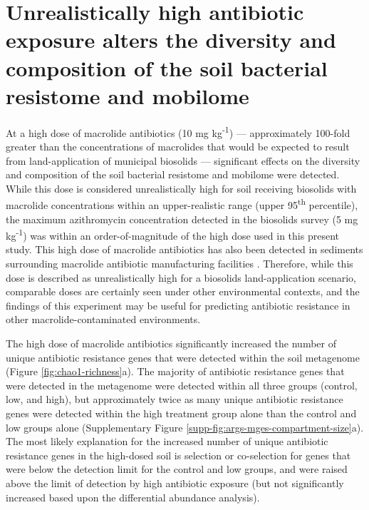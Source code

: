 \section{Unrealistically high antibiotic exposure alters the diversity and composition of the soil bacterial resistome and mobilome}

At a high dose of macrolide antibiotics (10 mg kg\textsuperscript{-1}) --- approximately 100-fold greater than the concentrations of macrolides that would be expected to result from land-application of municipal biosolids --- significant effects on the diversity and composition of the soil bacterial resistome and mobilome were detected.
While this dose is considered unrealistically high for soil receiving biosolids with macrolide concentrations within an upper-realistic range (upper 95\textsuperscript{th} percentile), the maximum azithromycin concentration detected in the \cite{U.S.EnvironmentalProtectionAgency.2009} biosolids survey (5 mg kg\textsuperscript{-1}) was within an order-of-magnitude of the high dose used in this present study.
This high dose of macrolide antibiotics has also been detected in sediments surrounding macrolide antibiotic manufacturing facilities \parencite{GonzalezPlaza.2019}.
Therefore, while this dose is described as unrealistically high for a biosolids land-application scenario, comparable doses are certainly seen under other environmental contexts, and the findings of this experiment may be useful for predicting antibiotic resistance in other macrolide-contaminated environments.

The high dose of macrolide antibiotics significantly increased the number of unique antibiotic resistance genes that were detected within the soil metagenome (Figure \ref{fig:chao1-richness}a).
The majority of antibiotic resistance genes that were detected in the metagenome were detected within all three groups (control, low, and high), but approximately twice as many unique antibiotic resistance genes were detected within the high treatment group alone than the control and low groups alone (Supplementary Figure \ref{supp-fig:args-mges-compartment-size}a).
The most likely explanation for the increased number of unique antibiotic resistance genes in the high-dosed soil is selection or co-selection for genes that were below the detection limit for the control and low groups, and were raised above the limit of detection by high antibiotic exposure (but not significantly increased based upon the differential abundance analysis).

